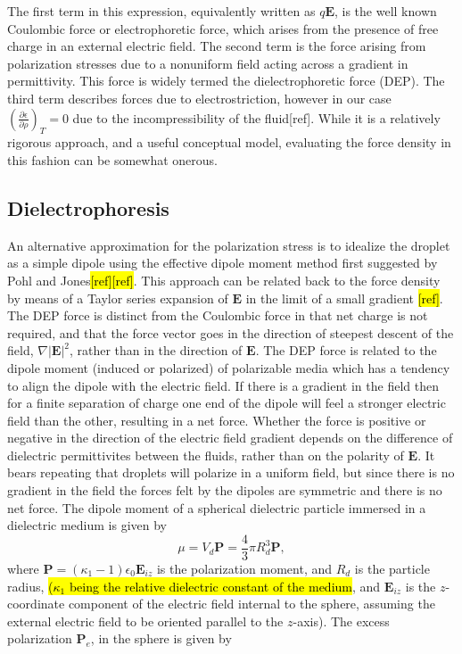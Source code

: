 \documentclass[a4paper, 12pt]{article}
\begin{document}
The first term in this expression, equivalently written as $q\mathbf{E}$, is the well known Coulombic force or electrophoretic force, which arises from the presence of free charge in an external electric field. The second term is the force arising from polarization stresses due to a nonuniform field acting across a gradient in permittivity. This force is widely termed the dielectrophoretic force (DEP). The third term describes forces due to electrostriction, however in our case $\left( \frac{\partial \epsilon}{\partial \rho} \right)_T = 0$ due to the  incompressibility of the fluid[ref]. While it is a relatively rigorous approach, and a useful conceptual model, evaluating the force density in this fashion can be somewhat onerous. 

\subsection{Dielectrophoresis}
An alternative approximation for the polarization stress is to idealize the droplet as a simple dipole using the effective dipole moment method first suggested by Pohl and Jones\hl{[ref][ref]}. This approach can be related back to the force density by means of a Taylor series expansion of $\mathbf{E}$ in the limit of a small gradient \hl{[ref]}. The DEP force is distinct from the Coulombic force in that net charge is not required, and that the force vector goes in the direction of steepest descent of the field, $\nabla \left| \mathbf{E} \right|^2$, rather than in the direction of $\mathbf{E}$. The DEP force is related to the dipole moment (induced or polarized) of polarizable media which has a tendency to align the dipole with the electric field. If there is a gradient in the field then for a finite separation of charge one end of the dipole will feel a stronger electric field than the other, resulting in a net force. Whether the force is positive or negative in the direction of the electric field gradient depends on the difference of dielectric permittivites between the fluids, rather than on the polarity of $\mathbf{E}$. It bears repeating that droplets will polarize in a uniform field, but since there is no gradient in the field the forces felt by the dipoles are symmetric and there is no net force. The dipole moment of a spherical dielectric particle immersed in a dielectric medium is given by
\begin{equation} \label{dipole_m_1}
\mu = V_d \mathbf{P} = \frac{4}{3} \pi R_d^3 \mathbf{P},
\end{equation} 
where $\mathbf{P} = \left(\kappa_1 - 1 \right) \epsilon_0 \mathbf{E}_{iz}$ is the polarization moment, and $R_d$ is the particle radius, \hl{($\kappa_1$ being the relative dielectric constant of the medium}, and $\mathbf{E}_{iz}$ is the $z$-coordinate component of the electric field internal to the sphere, assuming the external electric field to be oriented parallel to the $z$-axis). The excess polarization $\mathbf{P}_e$, in the sphere is given by
\end{document}
